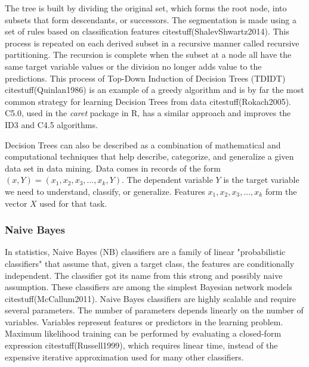 \documentclass[preprint,12pt]{elsarticle}
\begin{document}
The tree is built by dividing the original set, which forms the root node, into subsets that form descendants, or successors. The segmentation is made using a set of rules based on classification features citestuff(ShalevShwartz2014). This process is repeated on each derived subset in a recursive manner called recursive partitioning. The recursion is complete when the subset at a node all have the same target variable values or the division no longer adds value to the predictions. This process of Top-Down Induction of Decision Trees (TDIDT) citestuff(Quinlan1986) is an example of a greedy algorithm and is by far the most common strategy for learning Decision Trees from data citestuff(Rokach2005). C5.0, used in the \textit{caret} package in R, has a similar approach and improves the ID3 and C4.5 algorithms.

Decision Trees can also be described as a combination of mathematical and computational techniques that help describe, categorize, and generalize a given data set in data mining. Data comes in records of the form $(x, Y) = (x_{1}, x_{2}, x_{3}, \ldots, x_{k}, Y)$. The dependent variable $Y$ is the target variable we need to understand, classify, or generalize. Features $x_{1}, x_{2}, x_{3}, \ldots, x_{k}$ form the vector $X$ used for that task.

\subsubsection{Naive Bayes}

In statistics, Naive Bayes (NB) classifiers are a family of linear "probabilistic classifiers" that assume that, given a target class, the features are conditionally independent. The classifier got its name from this strong and possibly naive assumption. These classifiers are among the simplest Bayesian network models citestuff(McCallum2011). Naive Bayes classifiers are highly scalable and require several parameters. The number of parameters depends linearly on the number of variables. Variables represent features or predictors in the learning problem. Maximum likelihood training can be performed by evaluating a closed-form expression citestuff(Russell1999), which requires linear time, instead of the expensive iterative approximation used for many other classifiers.
\end{document}
